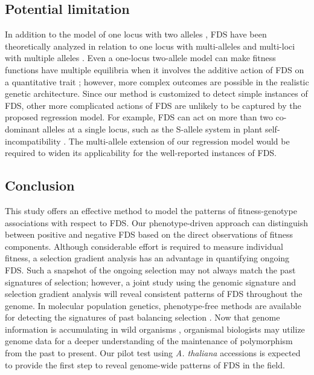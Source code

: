 \documentclass[12pt,]{article}
\begin{document}
\subsection{Potential limitation}
In addition to the model of one locus with two alleles \citep{cockerham1972frequency, asmussen_frequency-dependent_1990, schneider_maximization_2008}, FDS have been theoretically analyzed in relation to one locus with multi-alleles \citep{schneider2006multilocus, trotter2007frequency} and multi-loci with multiple alleles \citep{schneider2010maximization}. Even a one-locus two-allele model can make fitness functions have multiple equilibria when it involves the additive action of FDS on a quantitative trait \citep[][Fig. \ref{figS2:FDSadd}; Appendix S2]{schneider_maximization_2008}; however, more complex outcomes are possible in the realistic genetic architecture. Since our method is customized to detect simple instances of FDS, other more complicated actions of FDS are unlikely to be captured by the proposed regression model. For example, FDS can act on more than two co-dominant alleles at a single locus, such as the S-allele system in plant self-incompatibility \citep{hatakeyama1998dominance, shimizu2015evolution}. The multi-allele extension of our regression model would be required to widen its applicability for the well-reported instances of FDS. 

\subsection{Conclusion}
This study offers an effective method to model the patterns of fitness-genotype associations with respect to FDS. Our phenotype-driven approach can distinguish between positive and negative FDS based on the direct observations of fitness components. Although considerable effort is required to measure individual fitness, a selection gradient analysis has an advantage in quantifying ongoing FDS. Such a snapshot of the ongoing selection may not always match the past signatures of selection; however, a joint study using the genomic signature and selection gradient analysis will reveal consistent patterns of FDS throughout the genome. In molecular population genetics, phenotype-free methods are available for detecting the signatures of past balancing selection \citep{siewert_detecting_2017}. Now that genome information is accumulating in wild organisms \citep{lewin2018earth}, organismal biologists may utilize genome data for a deeper understanding of the maintenance of polymorphism from the past to present. Our pilot test using \textit{A. thaliana} accessions is expected to provide the first step to reveal genome-wide patterns of FDS in the field.
\end{document}
